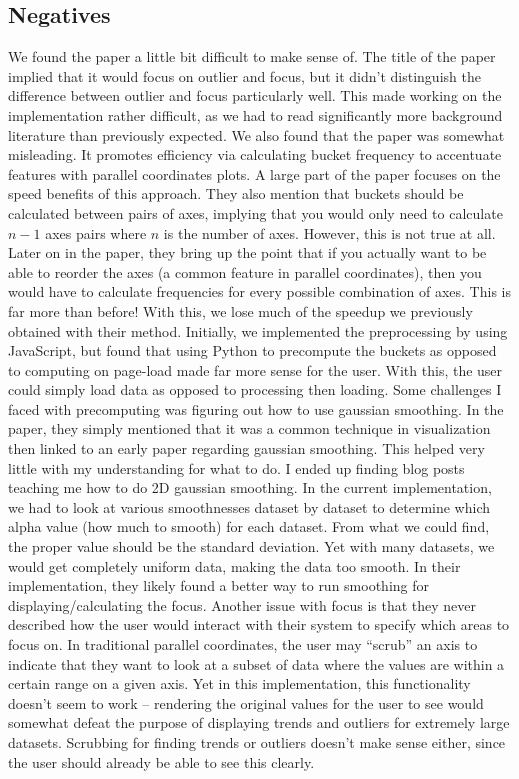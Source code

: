 \documentclass[	DIV=calc,%
			paper=a4,%
			fontsize=11pt,%
			twocolumn]{scrartcl}					%
\begin{document}
\subsection {Negatives}
We found the paper a little bit difficult to make sense of. The title of the paper implied that it would focus on outlier and focus, but it didn’t distinguish the difference between outlier and focus particularly well. This made working on the implementation rather difficult, as we had to read significantly more background literature than previously expected. 
We also found that the paper was somewhat misleading. It promotes efficiency via calculating bucket frequency to accentuate features with parallel coordinates plots. A large part of the paper focuses on the speed benefits of this approach. They also mention that buckets should be calculated between pairs of axes, implying that you would only need to calculate $n-1$ axes pairs where $n$ is the number of axes. However, this is not true at all. Later on in the paper, they bring up the point that if you actually want to be able to reorder the axes (a common feature in parallel coordinates), then you would have to calculate frequencies for every possible combination of axes. This is far more than before! With this, we lose much of the speedup we previously obtained with their method. 
Initially, we implemented the preprocessing by using JavaScript, but found that using Python to precompute the buckets as opposed to computing on page-load made far more sense for the user. With this, the user could simply load data as opposed to processing then loading. 
Some challenges I faced with precomputing was figuring out how to use gaussian smoothing. In the paper, they simply mentioned that it was a common technique in visualization then linked to an early paper regarding gaussian smoothing. This helped very little with my understanding for what to do. I ended up finding blog posts teaching me how to do 2D gaussian smoothing. In the current implementation, we had to look at various smoothnesses dataset by dataset to determine which alpha value (how much to smooth) for each dataset. From what we could find, the proper value should be the standard deviation. Yet with many datasets, we would get completely uniform data, making the data too smooth. In their implementation, they likely found a better way to run smoothing for displaying/calculating the focus. 
Another issue with focus is that they never described how the user would interact with their system to specify which areas to focus on. In traditional parallel coordinates, the user may “scrub” an axis to indicate that they want to look at a subset of data where the values are within a certain range on a given axis. Yet in this implementation, this functionality doesn’t seem to work -- rendering the original values for the user to see would somewhat defeat the purpose of displaying trends and outliers for extremely large datasets. Scrubbing for finding trends or outliers doesn’t make sense either, since the user should already be able to see this clearly. 
\end{document}
